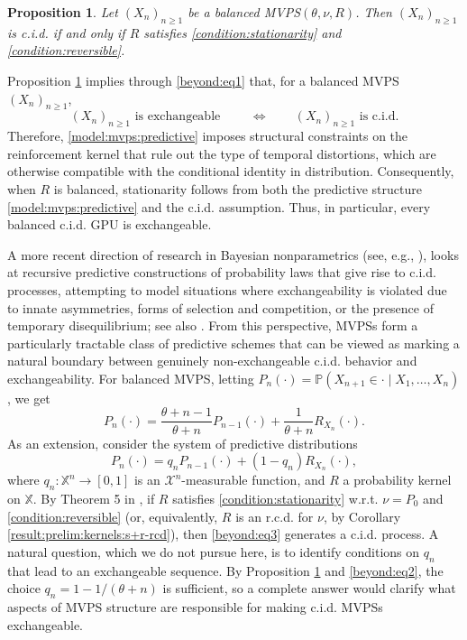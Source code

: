 \documentclass[a4paper]{article}
\theoremstyle{plain}
\newtheorem{proposition}[theorem]{Proposition}
\theoremstyle{remark}
\theoremstyle{definition}
\begin{document}
\begin{proposition}\label{results:other:cid}
Let $(X_n)_{n\geq1}$ be a balanced MVPS$(\theta,\nu,R)$. Then $(X_n)_{n\geq1}$ is c.i.d. if and only if $R$ satisfies \eqref{condition:stationarity} and \eqref{condition:reversible}.
\end{proposition}

Proposition \ref{results:other:cid} implies through \eqref{beyond:eq1} that, for a balanced MVPS $(X_n)_{n\geq1}$,
\[(X_n)_{n\geq1}\mbox{ is exchangeable }\qquad\Longleftrightarrow\qquad (X_n)_{n\geq1}\mbox{ is c.i.d.}\]
Therefore, \eqref{model:mvps:predictive} imposes structural constraints on the reinforcement kernel that rule out the type of temporal distortions, which are otherwise compatible with the conditional identity in distribution. Consequently, when $R$ is balanced, stationarity follows from both the predictive structure \eqref{model:mvps:predictive} and the c.i.d. assumption. Thus, in particular, every balanced c.i.d. GPU is exchangeable.

A more recent direction of research in Bayesian nonparametrics (see, e.g., \cite{berti2021,fong2023,battiston2025,fortini2025}), looks at recursive predictive constructions of probability laws that give rise to c.i.d. processes, attempting to model situations where exchangeability is violated due to innate asymmetries, forms of selection and competition, or the presence of temporary disequilibrium; see also \cite{bassetti2010,sariev2023}. From this perspective, MVPSs form a particularly tractable class of predictive schemes that can be viewed as marking a natural boundary between genuinely non-exchangeable c.i.d. behavior and exchangeability. For balanced MVPS, letting $P_n(\cdot)=\mathbb{P}(X_{n+1}\in\cdot\mid X_1,\ldots,X_n)$, we get
\begin{equation}\label{beyond:eq2}
P_n(\cdot)=\frac{\theta+n-1}{\theta+n}P_{n-1}(\cdot)+\frac{1}{\theta+n}R_{X_n}(\cdot).
\end{equation}
As an extension, \cite{berti2021} consider the system of predictive distributions
\begin{equation}\label{beyond:eq3}
P_n(\cdot)=q_nP_{n-1}(\cdot)+(1-q_n)R_{X_n}(\cdot),
\end{equation}
where $q_n:\mathbb{X}^n\rightarrow[0,1]$ is an $\mathcal{X}^n$-measurable function, and $R$ a probability kernel on $\mathbb{X}$. By Theorem 5 in \cite{berti2021}, if $R$ satisfies \eqref{condition:stationarity} w.r.t. $\nu=P_0$ and \eqref{condition:reversible} (or, equivalently, $R$ is an r.c.d. for $\nu$, by Corollary \ref{result:prelim:kernels:s+r-rcd}), then \eqref{beyond:eq3} generates a c.i.d. process. A natural question, which we do not pursue here, is to identify conditions on $q_n$ that lead to an exchangeable sequence. By Proposition \ref{results:other:cid} and \eqref{beyond:eq2}, the choice $q_n=1-1/(\theta+n)$ is sufficient, so a complete answer would clarify what aspects of MVPS structure are responsible for making c.i.d. MVPSs exchangeable.
\end{document}
